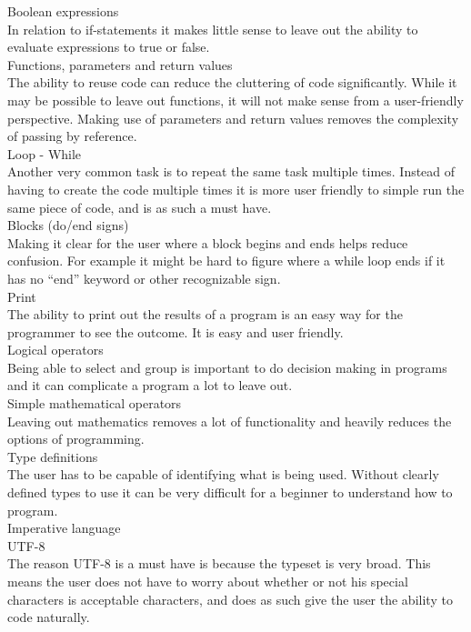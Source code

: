 Boolean expressions \\
In relation to if-statements it makes little sense to leave out the ability to evaluate expressions to true or false. \\

Functions, parameters and return values \\
The ability to reuse code can reduce the cluttering of code significantly. While it may be possible to leave out functions, it will not make sense from a user-friendly perspective. Making use of parameters and return values removes the complexity of passing by reference. \\

Loop - While \\
Another very common task is to repeat the same task multiple times. Instead of having to create the code multiple times it is more user friendly to simple run the same piece of code, and is as such a must have. \\

Blocks (do/end signs) \\
Making it clear for the user where a block begins and ends helps reduce confusion. For example it might be hard to figure where a while loop ends if it has no ``end'' keyword or other recognizable sign. \\

Print \\
The ability to print out the results of a program is an easy way for the programmer to see the outcome. It is easy and user friendly. \\

Logical operators \\
Being able to select and group is important to do decision making in programs and it can complicate a program a lot to leave out. \\

Simple mathematical operators \\
Leaving out mathematics removes a lot of functionality and heavily reduces the options of programming. \\

Type definitions \\
The user has to be capable of identifying what is being used. Without clearly defined types to use it can be very difficult for a beginner to understand how to program. \\

Imperative language \\ 

UTF-8 \\
The reason UTF-8 is a must have is because the typeset is very broad. This means the user does not have to worry about whether or not his special characters is acceptable characters, and does as such give the user the ability to code naturally.